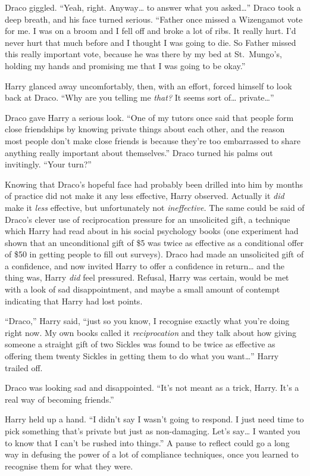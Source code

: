 Draco giggled. ``Yeah, right. Anyway\ldots{} to answer what you
asked\ldots{}'' Draco took a deep breath, and his face turned serious.
``Father once missed a Wizengamot vote for me. I was on a broom and I
fell off and broke a lot of ribs. It really hurt. I'd never hurt that
much before and I thought I was going to die. So Father missed this
really important vote, because he was there by my bed at St.~Mungo's,
holding my hands and promising me that I was going to be okay.''

Harry glanced away uncomfortably, then, with an effort, forced himself
to look back at Draco. ``Why are you telling me \emph{that?} It seems
sort of\ldots{} private\ldots{}''

Draco gave Harry a serious look. ``One of my tutors once said that
people form close friendships by knowing private things about each
other, and the reason most people don't make close friends is because
they're too embarrassed to share anything really important about
themselves.'' Draco turned his palms out invitingly. ``Your turn?''

Knowing that Draco's hopeful face had probably been drilled into him by
months of practice did not make it any less effective, Harry observed.
Actually it \emph{did} make it \emph{less} effective, but unfortunately
not \emph{ineffective.} The same could be said of Draco's clever use of
reciprocation pressure for an unsolicited gift, a technique which Harry
had read about in his social psychology books (one experiment had shown
that an unconditional gift of \$5 was twice as effective as a
conditional offer of \$50 in getting people to fill out surveys). Draco
had made an unsolicited gift of a confidence, and now invited Harry to
offer a confidence in return\ldots{} and the thing was, Harry \emph{did}
feel pressured. Refusal, Harry was certain, would be met with a look of
sad disappointment, and maybe a small amount of contempt indicating that
Harry had lost points.

``Draco,'' Harry said, ``just so you know, I recognise exactly what
you're doing right now. My own books called it \emph{reciprocation} and
they talk about how giving someone a straight gift of two Sickles was
found to be twice as effective as offering them twenty Sickles in
getting them to do what you want\ldots{}'' Harry trailed off.

Draco was looking sad and disappointed. ``It's not meant as a trick,
Harry. It's a real way of becoming friends.''

Harry held up a hand. ``I didn't say I wasn't going to respond. I just
need time to pick something that's private but just as non-damaging.
Let's say\ldots{} I wanted you to know that I can't be rushed into
things.'' A pause to reflect could go a long way in defusing the power
of a lot of compliance techniques, once you learned to recognise them
for what they were.


